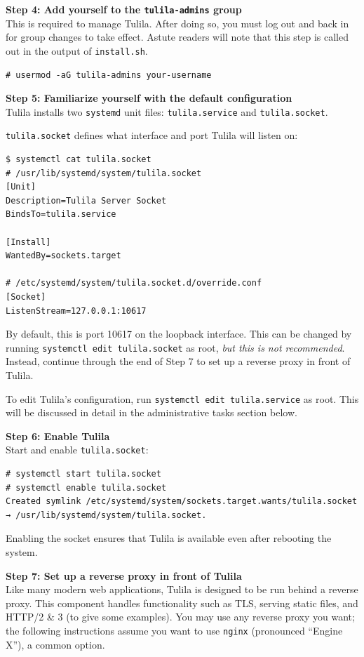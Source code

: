 \documentclass[12pt]{article}
\begin{document}
\bigskip
\textbf{Step 4: Add yourself to the \texttt{tulila-admins} group}\\
This is required to manage Tulila. After doing so, you must log out and back in for group changes to take effect. Astute readers will note that this step is called out in the output of \texttt{install.sh}.

\begin{Verbatim}
# usermod -aG tulila-admins your-username
\end{Verbatim}

\bigskip
\textbf{Step 5: Familiarize yourself with the default configuration}\\
Tulila installs two \texttt{systemd} unit files: \texttt{tulila.service} and \texttt{tulila.socket}.

\texttt{tulila.socket} defines what interface and port Tulila will listen on:

\begin{Verbatim}
$ systemctl cat tulila.socket
# /usr/lib/systemd/system/tulila.socket
[Unit]
Description=Tulila Server Socket
BindsTo=tulila.service

[Install]
WantedBy=sockets.target

# /etc/systemd/system/tulila.socket.d/override.conf
[Socket]
ListenStream=127.0.0.1:10617
\end{Verbatim}

By default, this is port 10617 on the loopback interface. This can be changed by running \texttt{systemctl edit tulila.socket} as root, \textit{but this is not recommended}. Instead, continue through the end of Step 7 to set up a reverse proxy in front of Tulila.

To edit Tulila's configuration, run \texttt{systemctl edit tulila.service} as root. This will be discussed in detail in the administrative tasks section below.

\bigskip
\textbf{Step 6: Enable Tulila}\\
Start and enable \texttt{tulila.socket}:

\begin{Verbatim}
# systemctl start tulila.socket
# systemctl enable tulila.socket
Created symlink /etc/systemd/system/sockets.target.wants/tulila.socket → /usr/lib/systemd/system/tulila.socket.
\end{Verbatim}

Enabling the socket ensures that Tulila is available even after rebooting the system.

\bigskip
\textbf{Step 7: Set up a reverse proxy in front of Tulila}\\
Like many modern web applications, Tulila is designed to be run behind a reverse proxy. This component handles functionality such as TLS, serving static files, and HTTP/2 \& 3 (to give some examples). You may use any reverse proxy you want; the following instructions assume you want to use \texttt{nginx} (pronounced ``Engine X''), a common option.
\end{document}
